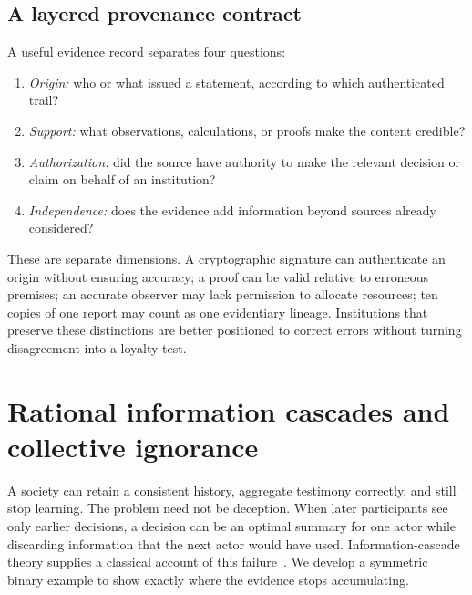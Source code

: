 \subsection{A layered provenance contract}

A useful evidence record separates four questions:
\begin{enumerate}[label=(\roman*),leftmargin=2.1em]
\item \emph{Origin:} who or what issued a statement, according to which authenticated trail?
\item \emph{Support:} what observations, calculations, or proofs make the content credible?
\item \emph{Authorization:} did the source have authority to make the relevant decision or claim on behalf of an institution?
\item \emph{Independence:} does the evidence add information beyond sources already considered?
\end{enumerate}
These are separate dimensions. A cryptographic signature can authenticate an origin without ensuring accuracy; a proof can be valid relative to erroneous premises; an accurate observer may lack permission to allocate resources; ten copies of one report may count as one evidentiary lineage. Institutions that preserve these distinctions are better positioned to correct errors without turning disagreement into a loyalty test.


\section{Rational information cascades and collective ignorance}\label{MS:sec:cascades}

A society can retain a consistent history, aggregate testimony correctly, and still stop learning. The problem need not be deception. When later participants see only earlier decisions, a decision can be an optimal summary for one actor while discarding information that the next actor would have used. Information-cascade theory supplies a classical account of this failure~\cite{MS:bikhchandani1992}. We develop a symmetric binary example to show exactly where the evidence stops accumulating.


